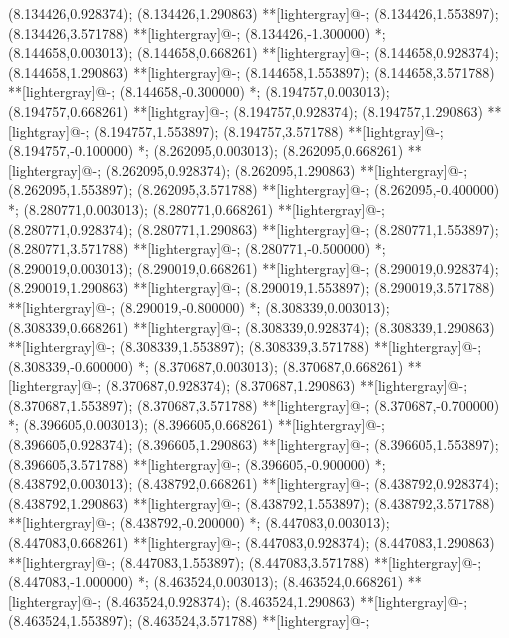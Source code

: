 (8.134426,0.928374); (8.134426,1.290863) **[lightergray]@{-};
(8.134426,1.553897); (8.134426,3.571788) **[lightergray]@{-};
(8.134426,-1.300000) *{};
(8.144658,0.003013); (8.144658,0.668261) **[lightergray]@{-};
(8.144658,0.928374); (8.144658,1.290863) **[lightergray]@{-};
(8.144658,1.553897); (8.144658,3.571788) **[lightergray]@{-};
(8.144658,-0.300000) *{};
(8.194757,0.003013); (8.194757,0.668261) **[lightgray]@{-};
(8.194757,0.928374); (8.194757,1.290863) **[lightgray]@{-};
(8.194757,1.553897); (8.194757,3.571788) **[lightgray]@{-};
(8.194757,-0.100000) *{};
(8.262095,0.003013); (8.262095,0.668261) **[lightergray]@{-};
(8.262095,0.928374); (8.262095,1.290863) **[lightergray]@{-};
(8.262095,1.553897); (8.262095,3.571788) **[lightergray]@{-};
(8.262095,-0.400000) *{};
(8.280771,0.003013); (8.280771,0.668261) **[lightergray]@{-};
(8.280771,0.928374); (8.280771,1.290863) **[lightergray]@{-};
(8.280771,1.553897); (8.280771,3.571788) **[lightergray]@{-};
(8.280771,-0.500000) *{};
(8.290019,0.003013); (8.290019,0.668261) **[lightergray]@{-};
(8.290019,0.928374); (8.290019,1.290863) **[lightergray]@{-};
(8.290019,1.553897); (8.290019,3.571788) **[lightergray]@{-};
(8.290019,-0.800000) *{};
(8.308339,0.003013); (8.308339,0.668261) **[lightergray]@{-};
(8.308339,0.928374); (8.308339,1.290863) **[lightergray]@{-};
(8.308339,1.553897); (8.308339,3.571788) **[lightergray]@{-};
(8.308339,-0.600000) *{};
(8.370687,0.003013); (8.370687,0.668261) **[lightergray]@{-};
(8.370687,0.928374); (8.370687,1.290863) **[lightergray]@{-};
(8.370687,1.553897); (8.370687,3.571788) **[lightergray]@{-};
(8.370687,-0.700000) *{};
(8.396605,0.003013); (8.396605,0.668261) **[lightergray]@{-};
(8.396605,0.928374); (8.396605,1.290863) **[lightergray]@{-};
(8.396605,1.553897); (8.396605,3.571788) **[lightergray]@{-};
(8.396605,-0.900000) *{};
(8.438792,0.003013); (8.438792,0.668261) **[lightergray]@{-};
(8.438792,0.928374); (8.438792,1.290863) **[lightergray]@{-};
(8.438792,1.553897); (8.438792,3.571788) **[lightergray]@{-};
(8.438792,-0.200000) *{};
(8.447083,0.003013); (8.447083,0.668261) **[lightergray]@{-};
(8.447083,0.928374); (8.447083,1.290863) **[lightergray]@{-};
(8.447083,1.553897); (8.447083,3.571788) **[lightergray]@{-};
(8.447083,-1.000000) *{};
(8.463524,0.003013); (8.463524,0.668261) **[lightergray]@{-};
(8.463524,0.928374); (8.463524,1.290863) **[lightergray]@{-};
(8.463524,1.553897); (8.463524,3.571788) **[lightergray]@{-};
